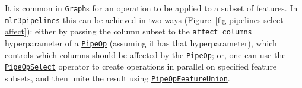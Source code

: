 It is common in
\href{https://mlr3pipelines.mlr-org.com/reference/Graph.html}{\texttt{Graph}}s
for an operation to be applied to a subset of features. In
\texttt{mlr3pipelines} this can be achieved in two ways
(Figure~\ref{fig-pipelines-select-affect}): either by passing the column
subset to the \texttt{affect\_columns} hyperparameter of a
\href{https://mlr3pipelines.mlr-org.com/reference/PipeOp.html}{\texttt{PipeOp}}
(assuming it has that hyperparameter), which controls which columns
should be affected by the \texttt{PipeOp}; or, one can use the
\href{https://mlr3pipelines.mlr-org.com/reference/mlr_pipeops_select.html}{\texttt{PipeOpSelect}}
operator to create operations in parallel on specified feature subsets,
and then unite the result using
\href{https://mlr3pipelines.mlr-org.com/reference/mlr_pipeops_featureunion.html}{\texttt{PipeOpFeatureUnion}}.

